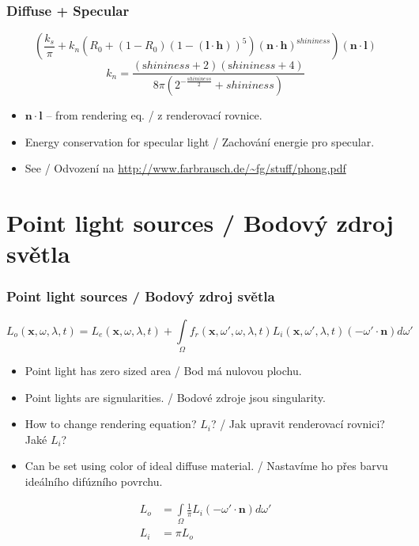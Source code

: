 \begin{frame}\frametitle{Diffuse + Specular}
    \begin{equation*}
        \left(\frac{k_s}{\pi} + k_n(R_0 + (1-R_0)(1-(\mathbf l \cdot \mathbf h))^5)(\mathbf n \cdot \mathbf h)^{\mathrm shininess}\right)(\mathbf n \cdot \mathbf l)
    \end{equation*}
    \begin{equation*}
        k_n = \frac{(\mathrm shininess + 2)(\mathrm shininess + 4)}{8\pi(2^{-\frac{shininess}{2}} + shininess)}
    \end{equation*}
    \begin{itemize}
        \item $\mathbf n \cdot \mathbf l$ -- from rendering eq. / z renderovací rovnice.
        \item Energy conservation for specular light / Zachování energie pro specular.
        \item See / Odvození na \url{http://www.farbrausch.de/~fg/stuff/phong.pdf}
    \end{itemize}
\end{frame}

\section{Point light sources / Bodový zdroj světla}

\begin{frame}\frametitle{Point light sources / Bodový zdroj světla}\scriptsize
    \begin{equation*}
        L_o(\mathbf x, \omega, \lambda, t) = L_e(\mathbf x, \omega, \lambda, t) + \int\limits_\Omega f_r(\mathbf x, \omega', \omega, \lambda, t) L_i(\mathbf x, \omega', \lambda, t) (-\omega' \cdot \mathbf n) d \omega'
    \end{equation*}
    \begin{itemize}
        \item Point light has zero sized area / Bod má nulovou plochu.
        \item Point lights are signularities. / Bodové zdroje jsou singularity.
        \item How to change rendering equation? $L_i$? / Jak upravit renderovací rovnici? Jaké $L_i$?
        \pause
        \item Can be set using color of ideal diffuse material. / Nastavíme ho přes barvu ideálního difúzního povrchu.
    \end{itemize}
    \begin{align*}
        L_o &= \int\limits_\Omega \frac{1}{\pi} L_i (-\omega' \cdot \mathbf n) d \omega' \\
        L_i &= \pi L_o
    \end{align*}
\end{frame}

